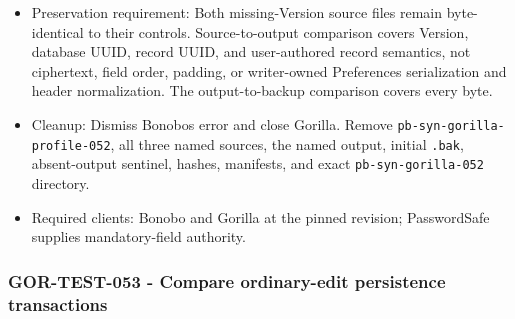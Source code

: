 \documentclass[
  letterpaper,
]{article}
\newcommand{\passthrough}[1]{#1}
\begin{document}
\begin{itemize}
  Version field type \passthrough{\lstinline!0x00!}, length 2, and bytes \passthrough{\lstinline!00 03!}; database UUID,
  record UUID, and user-authored record values match the input manifest. The named output and initial
  \passthrough{\lstinline!.bak!} are byte-identical.
\item
  Preservation requirement: Both missing-Version source files remain byte-identical to their controls. Source-to-output
  comparison covers Version, database UUID, record UUID, and user-authored record semantics, not ciphertext, field
  order, padding, or writer-owned Preferences serialization and header normalization. The output-to-backup comparison
  covers every byte.
\item
  Cleanup: Dismiss Bonobo\textquotesingle s error and close Gorilla. Remove \nolinkurl{pb-syn-gorilla-profile-052}, all
  three named sources, the named output, initial \passthrough{\lstinline!.bak!}, absent-output sentinel, hashes,
  manifests, and exact \nolinkurl{pb-syn-gorilla-052} directory.
\item
  Required clients: Bonobo and Gorilla at the pinned revision; PasswordSafe supplies mandatory-field authority.
\end{itemize}

\subsubsection{GOR-TEST-053 - Compare ordinary-edit persistence
transactions}\label{gor-test-053---compare-ordinary-edit-persistence-transactions}
\end{document}
